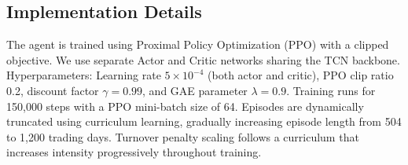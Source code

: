 \subsection{Implementation Details}
The agent is trained using Proximal Policy Optimization (PPO) \citep{schulman2017proximal} with a clipped objective. We use separate Actor and Critic networks sharing the TCN backbone.
Hyperparameters: Learning rate $5 \times 10^{-4}$ (both actor and critic), PPO clip ratio 0.2, discount factor $\gamma=0.99$, and GAE parameter $\lambda=0.9$.
Training runs for 150{,}000 steps with a PPO mini-batch size of 64.
Episodes are dynamically truncated using curriculum learning, gradually increasing episode length from 504 to 1{,}200 trading days.
Turnover penalty scaling follows a curriculum that increases intensity progressively throughout training.

